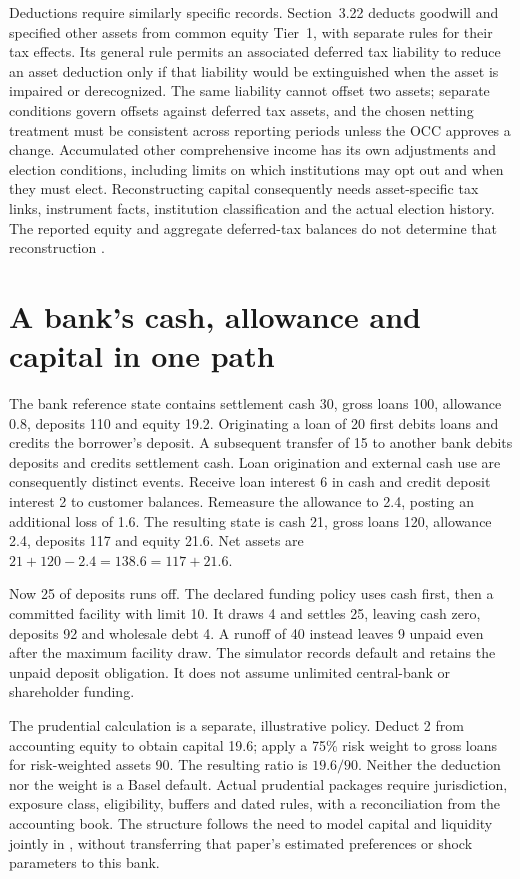 Deductions require similarly specific records. Section~3.22 deducts goodwill
and specified other assets from common equity Tier~1, with separate rules for
their tax effects. Its general rule permits an associated deferred tax
liability to reduce an asset deduction only if that liability would be
extinguished when the asset is impaired or derecognized. The same liability
cannot offset two assets; separate conditions govern offsets against deferred
tax assets, and the chosen netting treatment must be consistent across
reporting periods unless the OCC approves a change. Accumulated other
comprehensive income has its own adjustments and election conditions,
including limits on which institutions may opt out and when they must elect.
Reconstructing capital consequently needs asset-specific tax links, instrument
facts, institution classification and the actual election history. The reported
equity and aggregate deferred-tax balances do not determine that reconstruction
\citep[12~CFR~3.22(a), (b), (e)]{occcapitaldeductions2026}.


\section{A bank's cash, allowance and capital in one path}

The bank reference state contains settlement cash 30, gross loans 100,
allowance 0.8, deposits 110 and equity 19.2. Originating a loan of 20 first
debits loans and credits the borrower's deposit. A subsequent transfer of 15
to another bank debits deposits and credits settlement cash. Loan origination
and external cash use are consequently distinct events. Receive loan interest
6 in cash and credit deposit interest 2 to customer balances. Remeasure the
allowance to 2.4, posting an additional loss of 1.6. The resulting state is
cash 21, gross loans 120, allowance 2.4, deposits 117 and equity 21.6.
Net assets are $21+120-2.4=138.6=117+21.6$.

Now 25 of deposits runs off. The declared funding policy uses cash first,
then a committed facility with limit 10. It draws 4 and settles 25, leaving
cash zero, deposits 92 and wholesale debt 4. A runoff of 40 instead leaves
9 unpaid even after the maximum facility draw. The simulator records default
and retains the unpaid deposit obligation. It does not assume unlimited
central-bank or shareholder funding.

The prudential calculation is a separate, illustrative policy. Deduct 2 from
accounting equity to obtain capital 19.6; apply a 75\% risk weight to gross
loans for risk-weighted assets 90. The resulting ratio is $19.6/90$.
Neither the deduction nor the weight is a Basel default. Actual prudential
packages require jurisdiction, exposure class, eligibility, buffers and dated
rules, with a reconciliation from the accounting book. The structure follows
the need to model capital and liquidity jointly in
\citet[Section 2]{behn2019}, without transferring that paper's estimated
preferences or shock parameters to this bank.

